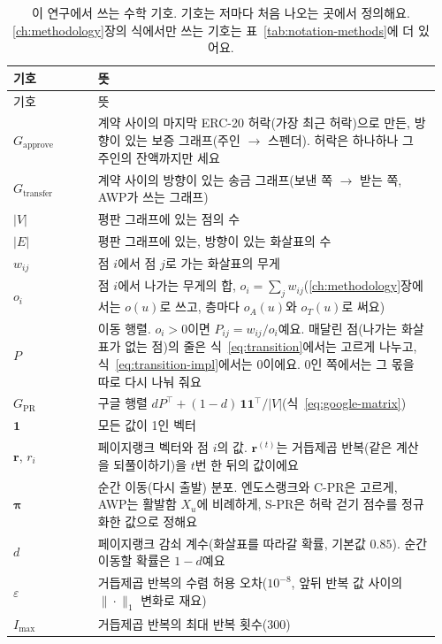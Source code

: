 \begin{longtable}{@{}>{\raggedright\arraybackslash}p{0.19\linewidth}p{0.77\linewidth}@{}}
\caption[이 연구에서 쓰는 수학 기호.]{이 연구에서 쓰는 수학 기호. 기호는 저마다 처음 나오는 곳에서 정의해요. \ref{ch:methodology}장의 식에서만 쓰는 기호는 표~\ref{tab:notation-methods}에 더 있어요.}\label{tab:notation}\\
\toprule
기호 & 뜻 \\
\midrule
\endfirsthead
\toprule
기호 & 뜻 \\
\midrule
\endhead
\bottomrule
\endfoot
$G_{\mathrm{approve}}$ & 계약 사이의 마지막 ERC-20 허락(가장 최근 허락)으로 만든, 방향이 있는 보증 그래프(주인 $\to$ 스펜더). 허락은 하나하나 그 주인의 잔액까지만 세요 \\
$G_{\mathrm{transfer}}$ & 계약 사이의 방향이 있는 송금 그래프(보낸 쪽 $\to$ 받는 쪽, AWP가 쓰는 그래프) \\
$|V|$ & 평판 그래프에 있는 점의 수 \\
$|E|$ & 평판 그래프에 있는, 방향이 있는 화살표의 수 \\
$w_{ij}$ & 점 $i$에서 점 $j$로 가는 화살표의 무게 \\
$o_i$ & 점 $i$에서 나가는 무게의 합, $o_i=\sum_j w_{ij}$(\ref{ch:methodology}장에서는 $o(u)$로 쓰고, 층마다 $o_A(u)$와 $o_T(u)$로 써요) \\
$P$ & 이동 행렬. $o_i>0$이면 $P_{ij}=w_{ij}/o_i$예요. 매달린 점(나가는 화살표가 없는 점)의 줄은 식~\eqref{eq:transition}에서는 고르게 나누고, 식~\eqref{eq:transition-impl}에서는 0이에요. 0인 쪽에서는 그 몫을 따로 다시 나눠 줘요 \\
$G_{\mathrm{PR}}$ & 구글 행렬 $dP^{\top}+(1-d)\,\mathbf{1}\mathbf{1}^{\top}/|V|$(식~\eqref{eq:google-matrix}) \\
$\mathbf{1}$ & 모든 값이 1인 벡터 \\
$\mathbf{r}$, $r_i$ & 페이지랭크 벡터와 점 $i$의 값. $\mathbf{r}^{(t)}$는 거듭제곱 반복(같은 계산을 되풀이하기)을 $t$번 한 뒤의 값이에요 \\
$\boldsymbol{\pi}$ & 순간 이동(다시 출발) 분포. 엔도스랭크와 \mbox{C-PR}은 고르게, AWP는 활발함 $X_u$에 비례하게, \mbox{S-PR}은 허락 걷기 점수를 정규화한 값으로 정해요 \\
$d$ & 페이지랭크 감쇠 계수(화살표를 따라갈 확률, 기본값 $0.85$). 순간 이동할 확률은 $1-d$예요 \\
$\varepsilon$ & 거듭제곱 반복의 수렴 허용 오차($10^{-8}$, 앞뒤 반복 값 사이의 $\|\cdot\|_1$ 변화로 재요) \\
$I_{\max}$ & 거듭제곱 반복의 최대 반복 횟수($300$) \\

\end{longtable}
